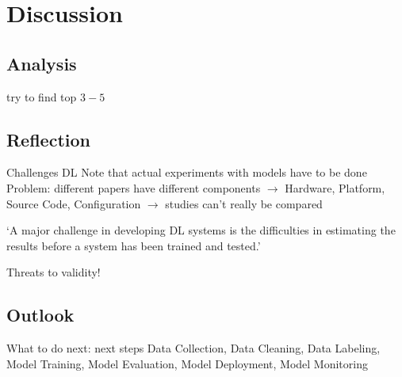 \chapter{Discussion}\label{ch:discussion}
\section{Analysis}
try to find top $3-5$


\section{Reflection}
Challenges DL\citep{arpteg_software_2018}
Note that actual experiments with models have to be done
Problem: different papers have different components
$\rightarrow$ Hardware, Platform, Source Code, Configuration
$\rightarrow$ studies can't really be compared

`A major challenge in developing DL systems is the difficulties in estimating
the results before a system has been trained and tested.'~\citep{arpteg_software_2018}

Threats to validity!

\section{Outlook}

What to do next: next steps
Data Collection, Data Cleaning, Data Labeling, Model Training, Model Evaluation, Model Deployment,
Model Monitoring~\cite{watanabe_preliminary_2019}
